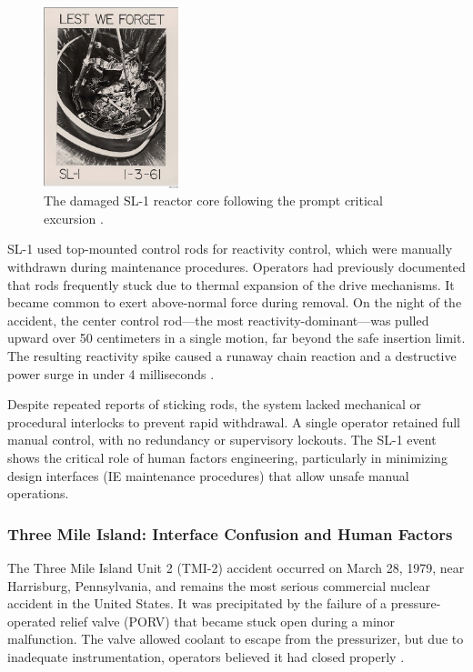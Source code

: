 \documentclass[12pt]{article}
\begin{document}
\begin{figure}[H]
    \centering
    \includegraphics[width=0.35\textwidth]{sl1diagram.jpg}
    \caption{The damaged SL-1 reactor core following the prompt critical excursion \autocite{sl1report}.}
    \label{fig:sl1diagram}
\end{figure}

SL-1 used top-mounted control rods for reactivity control, which were manually withdrawn during maintenance procedures. Operators had previously documented that rods frequently stuck due to thermal expansion of the drive mechanisms. It became common to exert above-normal force during removal. On the night of the accident, the center control rod—the most reactivity-dominant—was pulled upward over 50 centimeters in a single motion, far beyond the safe insertion limit. The resulting reactivity spike caused a runaway chain reaction and a destructive power surge in under 4 milliseconds \autocite{sl1report}.

Despite repeated reports of sticking rods, the system lacked mechanical or
procedural interlocks to prevent rapid withdrawal. A single operator retained
full manual control, with no redundancy or supervisory lockouts. The SL-1 event
shows the critical role of human factors engineering, particularly in minimizing
design interfaces (IE maintenance procedures) that allow unsafe manual operations.

\subsubsection*{Three Mile Island: Interface Confusion and Human Factors}
The Three Mile Island Unit 2 (TMI-2) accident occurred on March 28, 1979, near Harrisburg, Pennsylvania, and remains the most serious commercial nuclear accident in the United States. It was precipitated by the failure of a pressure-operated relief valve (PORV) that became stuck open during a minor malfunction. The valve allowed coolant to escape from the pressurizer, but due to inadequate instrumentation, operators believed it had closed properly \autocite{tmiwalker}.
\end{document}
